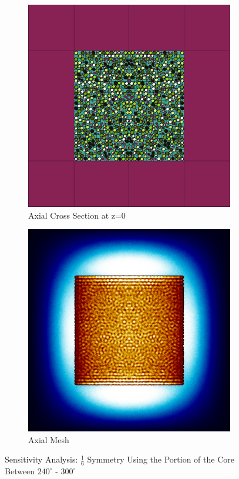 \begin{figure}[H]
\begin{subfigure}{0.45\textwidth}
  \includegraphics[width=0.95\linewidth]{figures/240-300/240-300-v}
  \caption{Axial Cross Section at z=0 }
  \label{fig:240-300-v}
\end{subfigure}
%
\begin{subfigure}{0.45\textwidth}
  \includegraphics[width=0.95\linewidth]{figures/240-300/240-300-vm}
  \caption{Axial Mesh}
  \label{fig:240-300-vm}
\end{subfigure}
%
\caption{Sensitivity Analysis: $\frac{1}{6}$ Symmetry Using the Portion of the Core Between $240^{\circ}$ - $300^{\circ}$}
\label{fig:240-300}
\end{figure}